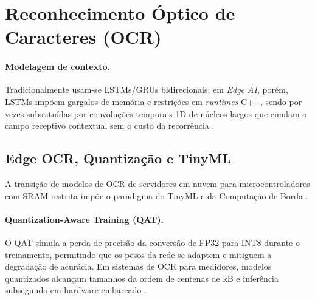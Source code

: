 \section{Reconhecimento Óptico de Caracteres (OCR)}
\label{sec:ocr}


\paragraph{Modelagem de contexto.}
Tradicionalmente usam-se LSTMs/GRUs bidirecionais; 
em \textit{Edge AI}, porém, LSTMs impõem gargalos de memória e restrições 
em \textit{runtimes} C++, sendo por vezes substituídas por convoluções 
temporais 1D de núcleos largos que emulam o campo receptivo contextual 
sem o custo da recorrência \cite{shi2017crnn}.


\subsection{Edge OCR, Quantização e TinyML}
A transição de modelos de OCR de servidores em nuvem para microcontroladores com
SRAM restrita impõe o paradigma do TinyML e da Computação de Borda \cite{ademola2023resource}.

\paragraph{Quantization-Aware Training (QAT).}
O QAT simula a perda de precisão da conversão de FP32 para INT8 durante o treinamento, 
permitindo que os pesos da rede se adaptem e mitiguem a degradação de acurácia. 
Em sistemas de OCR para medidores, 
modelos quantizados alcançam tamanhos da ordem de centenas de kB e 
inferência subsegundo em hardware embarcado 
\cite{ademola2023resource, jawas2018water}.